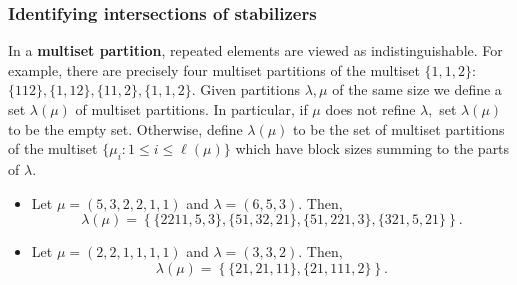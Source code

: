 \documentclass[ALCO, Unicode]{cedram}
\begin{document}
\subsubsection{Identifying intersections of stabilizers} \label{subsec:stabilizers}
\begin{defi}
In a \textbf{multiset partition}, repeated elements are viewed as indistinguishable. For example, there are precisely four multiset partitions of the multiset $\{1, 1, 2\}:$ $\{112\}, \{1, 12\}, \{11, 2\}, \{1, 1, 2\}.$ Given partitions $\lambda, \mu$ of the same size we define a set \textbf{$\lambda(\mu)$} of multiset partitions.  In particular, if $\mu$ does not refine $\lambda,$ set $\lambda(\mu)$ to be the empty set. Otherwise, define $\lambda(\mu)$ to be the set of multiset partitions of the multiset $\{\mu_i: 1 \leq i \leq \ell(\mu)\}$ which have block sizes summing to the parts of $\lambda$.
\end{defi}
\begin{exam}
\begin{itemize}
    \item Let $\mu = (5, 3, 2, 2, 1,1)$ and $\lambda = (6, 5, 3).$ Then, \[\lambda(\mu) = \left\{\{ 2211 , 5 , 3\},\{ 51, 32, 21\}, \{ 51 , 221 , 3\}, \{ 321 , 5 , 21\} \right \}. \]
    \item Let $\mu = (2, 2, 1, 1, 1, 1)$ and $\lambda = (3,3,2)$. Then, 
    \[\lambda(\mu) = \left\{ \{21, 21, 11\}, \{21 , 111 , 2\}\right\}.\]
\end{itemize}
\end{exam}
\end{document}
